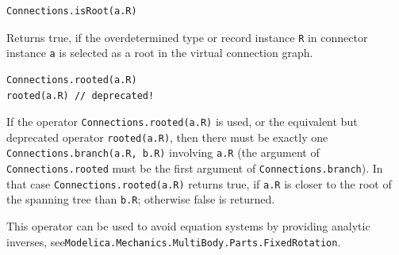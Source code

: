 \begin{operatordefinition}
\begin{synopsis}\begin{lstlisting}
Connections.isRoot(a.R)
\end{lstlisting}\end{synopsis}
\begin{semantics}
Returns true, if the overdetermined type or record instance \lstinline!R! in connector instance \lstinline!a! is selected as a root in the virtual connection graph.
\end{semantics}
\end{operatordefinition}

\begin{operatordefinition}
\begin{synopsis}\begin{lstlisting}
Connections.rooted(a.R)
rooted(a.R) // deprecated!
\end{lstlisting}\end{synopsis}
\begin{semantics}
If the operator \lstinline!Connections.rooted(a.R)! is used, or the equivalent but deprecated operator \lstinline!rooted(a.R)!, then there must be exactly one \lstinline!Connections.branch(a.R, b.R)! involving \lstinline!a.R! (the argument of \lstinline!Connections.rooted! must be the first argument of \lstinline!Connections.branch!).
In that case \lstinline!Connections.rooted(a.R)! returns true, if \lstinline!a.R! is closer to the root of the spanning tree than \lstinline!b.R!; otherwise false is returned.

\begin{nonnormative}
This operator can be used to avoid equation systems by providing analytic inverses, see\linebreak[4] \lstinline!Modelica.Mechanics.MultiBody.Parts.FixedRotation!.
\end{nonnormative}
\end{semantics}
\end{operatordefinition}

